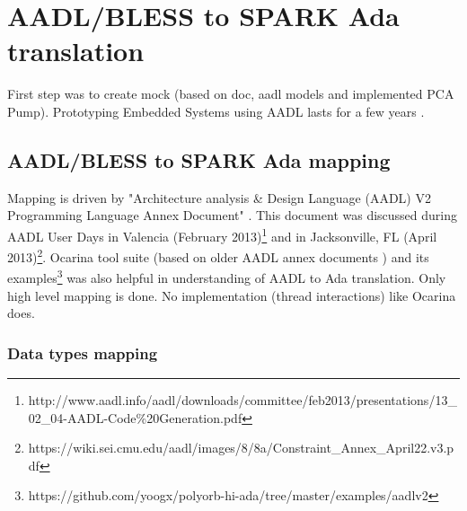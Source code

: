 
\cleardoublepage


\chapter{AADL/BLESS to SPARK Ada translation}
\label{codegen}

First step was to create mock (based on doc, aadl models and implemented PCA Pump).
Prototyping Embedded Systems using AADL lasts for a few years \cite{PrototypyingAadl:Paper}.

\section{AADL/BLESS to SPARK Ada mapping}
\label{codegen:mapping}



Mapping is driven by "Architecture analysis \& Design Language (AADL) V2 Programming Language Annex Document" \cite{AnnexDoc13}. This document was discussed during AADL User Days in Valencia (February 2013)\footnote{http://www.aadl.info/aadl/downloads/committee/feb2013/presentations/13\_02\_04-AADL-Code\%20Generation.pdf} and in Jacksonville, FL (April 2013)\footnote{https://wiki.sei.cmu.edu/aadl/images/8/8a/Constraint\_Annex\_April22.v3.pdf}. Ocarina tool suite (based on older AADL annex documents \cite{Ocarina:Article}) and its examples\footnote{https://github.com/yoogx/polyorb-hi-ada/tree/master/examples/aadlv2} was also helpful in understanding of AADL to Ada translation.
Only high level mapping is done. No implementation (thread interactions) like Ocarina does. 

\subsection{Data types mapping}
\label{codegen:mapping:data}

